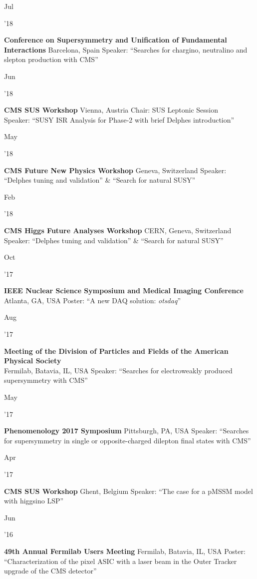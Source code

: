 \documentclass[]{cv} %
\begin{document}
\begin{entrylist}

  \entrytwo
  {\parbox[t]{\parboxWidthOne}{Jul}\parbox[t]{\parboxWidthTwo}{\hfill '18}}
  {\textbf{Conference on Supersymmetry and Unification of Fundamental Interactions}}
  {Barcelona, Spain}
  {Speaker: ``Searches for chargino, neutralino and slepton production with CMS''}

  \entry
  {\parbox[t]{\parboxWidthOne}{Jun}\parbox[t]{\parboxWidthTwo}{\hfill '18}}
  {\textbf{CMS SUS Workshop}}
  {Vienna, Austria}
  {Chair: SUS Leptonic Session\\
  Speaker: ``SUSY ISR Analysis for Phase-2 with brief Delphes introduction''}

  \entry
  {\parbox[t]{\parboxWidthOne}{May}\parbox[t]{\parboxWidthTwo}{\hfill '18}}
  {\textbf{CMS Future New Physics Workshop}}
  {Geneva, Switzerland}
  {Speaker: ``Delphes tuning and validation'' \& ``Search for natural SUSY''}

  \entry
  {\parbox[t]{\parboxWidthOne}{Feb}\parbox[t]{\parboxWidthTwo}{\hfill '18}}
  {\textbf{CMS Higgs Future Analyses Workshop}}
  {CERN, Geneva, Switzerland}
  {Speaker: ``Delphes tuning and validation'' \& ``Search for natural SUSY''}

  \entrytwo
  {\parbox[t]{\parboxWidthOne}{Oct}\parbox[t]{\parboxWidthTwo}{\hfill '17}}
  {\textbf{IEEE Nuclear Science Symposium and Medical Imaging Conference}}
  {Atlanta, GA, USA}
  {Poster: ``A new DAQ solution: \textit{otsdaq}''}

  \entry
  {\parbox[t]{\parboxWidthOne}{Aug}\parbox[t]{\parboxWidthTwo}{\hfill '17}}
  {\textbf{Meeting of the Division of Particles and Fields of the American
  Physical Society}\\}
  {Fermilab, Batavia, IL, USA}
  {Speaker: ``Searches for electroweakly produced supersymmetry with CMS''}

  \entry
  {\parbox[t]{\parboxWidthOne}{May}\parbox[t]{\parboxWidthTwo}{\hfill '17}}
  {\textbf{Phenomenology 2017 Symposium}}
  {Pittsburgh, PA, USA}
  {Speaker: ``Searches for supersymmetry in single or opposite-charged dilepton final states with CMS''}

  \entry
  {\parbox[t]{\parboxWidthOne}{Apr}\parbox[t]{\parboxWidthTwo}{\hfill '17}}
  {\textbf{CMS SUS Workshop}}
  {Ghent, Belgium}
  {Speaker: ``The case for a pMSSM model with higgsino LSP''}

  \entry
  {\parbox[t]{\parboxWidthOne}{Jun}\parbox[t]{\parboxWidthTwo}{\hfill '16}}
  {\textbf{49th Annual Fermilab Users Meeting}}
  {Fermilab, Batavia, IL, USA}
  {Poster: ``Characterization of the pixel ASIC with a laser beam in the Outer Tracker upgrade of the CMS detector''}


\end{entrylist}
\end{document}
